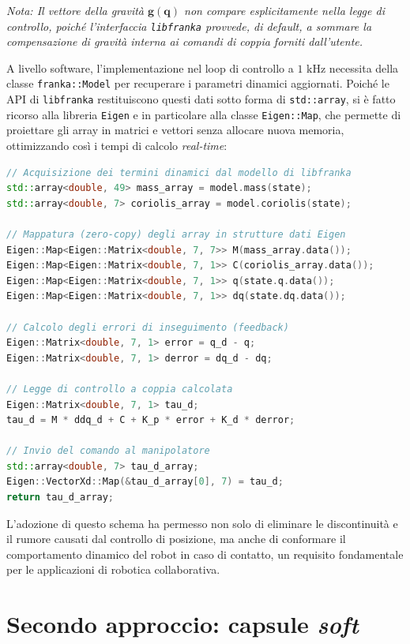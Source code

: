 \textit{Nota: Il vettore della gravità $\mathbf{g}(\mathbf{q})$ non compare esplicitamente nella legge di controllo, poiché l'interfaccia \texttt{libfranka} provvede, di default, a sommare la compensazione di gravità interna ai comandi di coppia forniti dall'utente.}

A livello software, l'implementazione nel loop di controllo a $1\text{ kHz}$ necessita della classe \texttt{franka::Model} per recuperare i parametri dinamici aggiornati. Poiché le API di \texttt{libfranka} restituiscono questi dati sotto forma di \texttt{std::array}, si è fatto ricorso alla libreria \texttt{Eigen} e in particolare alla classe \texttt{Eigen::Map}, che permette di proiettare gli array in matrici e vettori senza allocare nuova memoria, ottimizzando così i tempi di calcolo \textit{real-time}:

\begin{lstlisting}[language=C++]
// Acquisizione dei termini dinamici dal modello di libfranka
std::array<double, 49> mass_array = model.mass(state);
std::array<double, 7> coriolis_array = model.coriolis(state);

// Mappatura (zero-copy) degli array in strutture dati Eigen
Eigen::Map<Eigen::Matrix<double, 7, 7>> M(mass_array.data());
Eigen::Map<Eigen::Matrix<double, 7, 1>> C(coriolis_array.data());
Eigen::Map<Eigen::Matrix<double, 7, 1>> q(state.q.data());
Eigen::Map<Eigen::Matrix<double, 7, 1>> dq(state.dq.data());

// Calcolo degli errori di inseguimento (feedback)
Eigen::Matrix<double, 7, 1> error = q_d - q;
Eigen::Matrix<double, 7, 1> derror = dq_d - dq;

// Legge di controllo a coppia calcolata
Eigen::Matrix<double, 7, 1> tau_d;
tau_d = M * ddq_d + C + K_p * error + K_d * derror;

// Invio del comando al manipolatore
std::array<double, 7> tau_d_array;
Eigen::VectorXd::Map(&tau_d_array[0], 7) = tau_d;
return tau_d_array;
\end{lstlisting}

L'adozione di questo schema ha permesso non solo di eliminare le discontinuità e il rumore causati dal controllo di posizione, ma anche di conformare il comportamento dinamico del robot in caso di contatto, un requisito fondamentale per le applicazioni di robotica collaborativa.

\section{Secondo approccio: capsule \textit{soft}}


